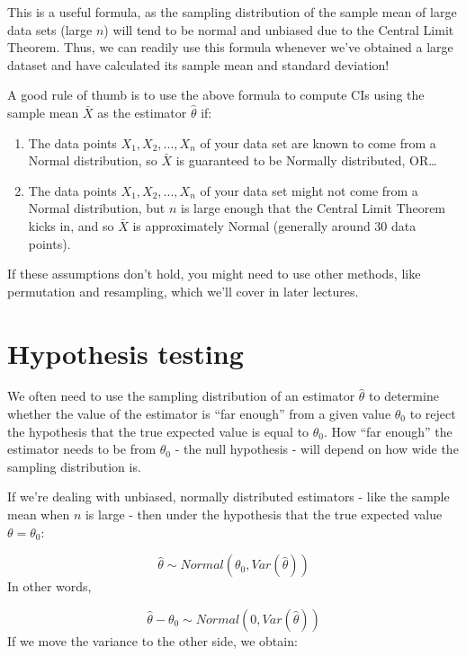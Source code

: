 \documentclass[
]{book}
\begin{document}
This is a useful formula, as the sampling distribution of the sample mean of large data sets (large \(n\)) will tend to be normal and unbiased due to the Central Limit Theorem. Thus, we can readily use this formula whenever we've obtained a large dataset and have calculated its sample mean and standard deviation!

A good rule of thumb is to use the above formula to compute CIs using the sample mean \(\bar{X}\) as the estimator \(\hat{\theta}\) if:

\begin{enumerate}
\def\labelenumi{\arabic{enumi}.}
\item
  The data points \(X_1, X_2, ..., X_n\) of your data set are known to come from a Normal distribution, so \(\bar{X}\) is guaranteed to be Normally distributed, OR\ldots{}
\item
  The data points \(X_1, X_2, ..., X_n\) of your data set might not come from a Normal distribution, but \(n\) is large enough that the Central Limit Theorem kicks in, and so \(\bar{X}\) is approximately Normal (generally around 30 data points).
\end{enumerate}

If these assumptions don't hold, you might need to use other methods, like permutation and resampling, which we'll cover in later lectures.

\hypertarget{hypothesis-testing}{%
\section{Hypothesis testing}\label{hypothesis-testing}}

We often need to use the sampling distribution of an estimator \(\hat{\theta}\) to determine whether the value of the estimator is ``far enough'' from a given value \(\theta_0\) to reject the hypothesis that the true expected value is equal to \(\theta_0\). How ``far enough'' the estimator needs to be from \(\theta_0\) - the null hypothesis - will depend on how wide the sampling distribution is.

If we're dealing with unbiased, normally distributed estimators - like the sample mean when \(n\) is large - then under the hypothesis that the true expected value \(\theta = \theta_0\):

\[\hat{\theta} \sim Normal(\theta_0, Var(\hat{\theta}))\]
In other words,

\[\hat{\theta} - \theta_0 \sim Normal(0, Var(\hat{\theta}))\]
If we move the variance to the other side, we obtain:
\end{document}
